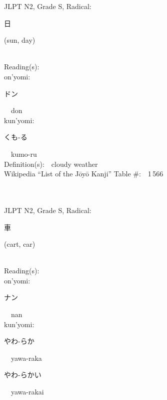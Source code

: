 \begin{multicols}{2}
{JLPT N2, Grade S, Radical:\ \ {\begin{CJK}{UTF8}{min} 日 \end{CJK}} (sun, day) } \\
Reading(s):\ \ \\
{\hspace*{1em}}on'yomi:\ \ \\
{\hspace*{2em}}{\begin{CJK}{UTF8}{min} ドン \end{CJK}}\ \ don\ \ \\
{\hspace*{1em}}kun'yomi:\ \ \\
{\hspace*{2em}}{\begin{CJK}{UTF8}{min} くも-る \end{CJK}}\ \ kumo-ru\ \ \\
Definition(s):\ \ cloudy weather \\
Wikipedia ``List of the J\=oy\=o Kanji'' Table \#:\ \ 1\,566 \\
\ \ \\
{\fontsize{34pt}{40pt}  }\ \ \\  %
{JLPT N2, Grade S, Radical:\ \ {\begin{CJK}{UTF8}{min} 車 \end{CJK}} (cart, car) } \\
Reading(s):\ \ \\
{\hspace*{1em}}on'yomi:\ \ \\
{\hspace*{2em}}{\begin{CJK}{UTF8}{min} ナン \end{CJK}}\ \ nan\ \ \\
{\hspace*{1em}}kun'yomi:\ \ \\
{\hspace*{2em}}{\begin{CJK}{UTF8}{min} やわ-らか \end{CJK}}\ \ yawa-raka\ \ \\
{\hspace*{2em}}{\begin{CJK}{UTF8}{min} やわ-らかい \end{CJK}}\ \ yawa-rakai\ \ \\

\end{multicols}
